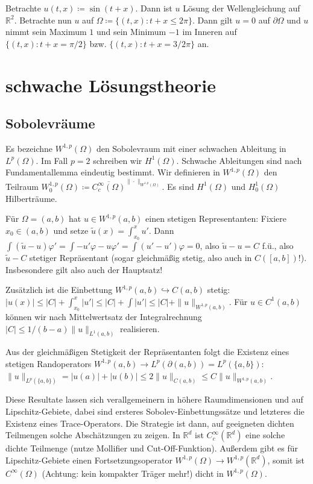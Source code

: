\documentclass[11pt,a4paper]{scrartcl}
\newcommand{\R}{\mathbb{R}} %
\theoremstyle{plain}
\theoremstyle{definition}
\theoremstyle{remark}
\begin{document}
Betrachte $u(t,x)\coloneqq \sin(t+x)$. Dann ist $u$ Lösung der Wellengleichung auf $\R^2$. Betrachte nun $u$ auf $\Omega \coloneqq \{ (t,x): t+x \leq 2\pi \}$. Dann gilt $u=0$ auf $\partial\Omega$ und $u$ nimmt sein Maximum $1$ und sein Minimum $-1$ im Inneren auf $\{ (t,x): t+x=\pi/2 \}$ bzw. $\{ (t,x): t+x=3/2\pi \}$ an.

\section{schwache Lösungstheorie}

\subsection{Sobolevräume}

Es bezeichne $W^{1,p}(\Omega)$ den Sobolevraum mit einer schwachen Ableitung in $L^p(\Omega)$. Im Fall $p=2$ schreiben wir $H^1(\Omega)$. Schwache Ableitungen sind nach Fundamentallemma eindeutig bestimmt. Wir definieren in $W^{1,p}(\Omega)$ den Teilraum $W^{1,p}_0(\Omega) \coloneqq \overline{C_c^\infty(\Omega)}^{\|\cdot\|_{W^{1,p}(\Omega)}}$. Es sind $H^1(\Omega)$ und $H^1_0(\Omega)$ Hilberträume.

Für $\Omega=(a,b)$ hat $u\in W^{1,p}(a,b)$ einen stetigen Representanten: Fixiere $x_0\in (a,b)$ und setze $\tilde u(x)=\int_{x_0}^x u'$. Dann $\int (\tilde u-u)\varphi'=\int -u'\varphi-u\varphi'=\int (u'-u')\varphi=0$, also $\tilde u-u=C$ f.ü., also $\tilde u-C$ stetiger Repräsentant (sogar gleichmäßig stetig, also auch in $C([a,b])$!). Insbesondere gilt also auch der Hauptsatz!

Zusätzlich ist die Einbettung $W^{1,p}(a,b) \hookrightarrow C(a,b)$ stetig: $|u(x)| \leq |C| + \int_{x_0}^x |u'| \leq |C| + \int |u'| \leq |C| +\|u\|_{W^{1,p}(a,b)}$. Für $u\in C^1(a,b)$ können wir nach Mittelwertsatz der Integralrechnung $|C| \leq 1/(b-a) \|u\|_{L^1(a,b)}$ realisieren.

Aus der gleichmäßigen Stetigkeit der Repräsentanten folgt die Existenz eines stetigen Randoperators $W^{1,p}(a,b)\to L^p(\partial (a,b))=L^p(\{a,b\})$: $\|u\|_{L^p(\{a,b\})} = |u(a)|+|u(b)| \leq 2 \|u\|_{C(a,b)} \leq C \|u\|_{W^{1,p}(a,b)}$.

Diese Resultate lassen sich verallgemeinern in höhere Raumdimensionen und auf Lipschitz-Gebiete, dabei sind ersteres Sobolev-Einbettungssätze und letzteres die Existenz eines Trace-Operators. Die Strategie ist dann, auf geeigneten dichten Teilmengen solche Abschätzungen zu zeigen. In $\R^d$ ist $C_c^\infty(\R^d)$ eine solche dichte Teilmenge (nutze Mollifier und Cut-Off-Funktion). Außerdem gibt es für Lipschitz-Gebiete einen Fortsetzungsoperator $W^{1,p}(\Omega) \to W^{1,p}(\R^d)$, somit ist $C^\infty(\Omega)$ (Achtung: kein kompakter Träger mehr!) dicht in $W^{1,p}(\Omega)$.
\end{document}
